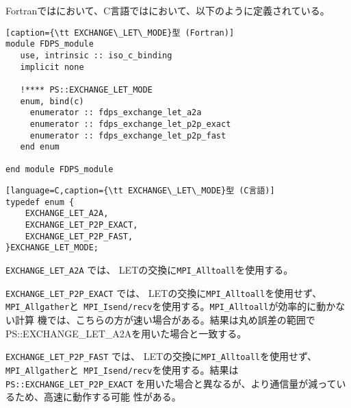 Fortranではにおいて、C言語ではにおいて、以下のように定義されている。

\begin{lstlisting}[caption={\tt EXCHANGE\_LET\_MODE}型 (Fortran)]
module FDPS_module
   use, intrinsic :: iso_c_binding
   implicit none
   
   !**** PS::EXCHANGE_LET_MODE
   enum, bind(c)
     enumerator :: fdps_exchange_let_a2a
     enumerator :: fdps_exchange_let_p2p_exact
     enumerator :: fdps_exchange_let_p2p_fast
   end enum
   
end module FDPS_module
\end{lstlisting}

\begin{lstlisting}[language=C,caption={\tt EXCHANGE\_LET\_MODE}型 (C言語)]
typedef enum {
    EXCHANGE_LET_A2A,
    EXCHANGE_LET_P2P_EXACT,
    EXCHANGE_LET_P2P_FAST,
}EXCHANGE_LET_MODE;
\end{lstlisting}

{\tt EXCHANGE\_LET\_A2A} では、
LETの交換に{\tt MPI\_Alltoall}を使用する。

{\tt EXCHANGE\_LET\_P2P\_EXACT} では、
LETの交換に{\tt MPI\_Alltoall}を使用せず、{\tt MPI\_Allgather}と{\tt
MPI\_Isend/recv}を使用する。{\tt MPI\_Alltoall}が効率的に動かない計算
機では、こちらの方が速い場合がある。結果は丸め誤差の範囲で
PS::EXCHANGE\_LET\_A2Aを用いた場合と一致する。

{\tt EXCHANGE\_LET\_P2P\_FAST} では、
LETの交換に{\tt MPI\_Alltoall}を使用せず、{\tt MPI\_Allgather}と{\tt
MPI\_Isend/recv}を使用する。結果は{\tt PS::EXCHANGE\_LET\_P2P\_EXACT}
を用いた場合と異なるが、より通信量が減っているため、高速に動作する可能
性がある。


